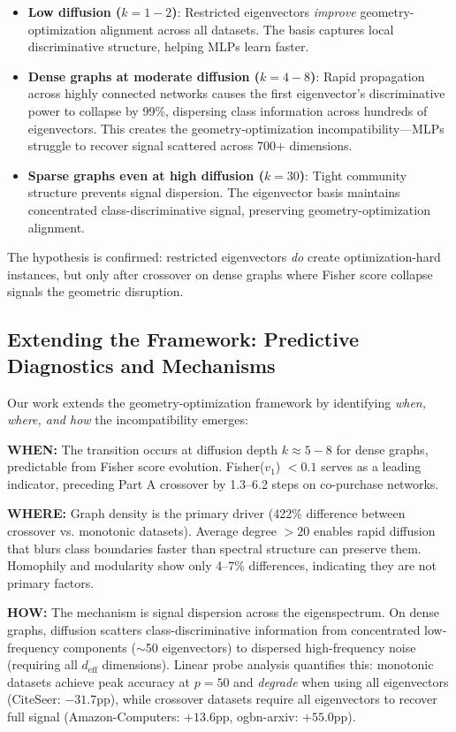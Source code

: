 \documentclass[11pt]{article}
\begin{document}
\begin{itemize}
\item \textbf{Low diffusion ($k{=}1{-}2$)}: Restricted eigenvectors \emph{improve} geometry-optimization alignment across all datasets. The basis captures local discriminative structure, helping MLPs learn faster.

\item \textbf{Dense graphs at moderate diffusion ($k{=}4{-}8$)}: Rapid propagation across highly connected networks causes the first eigenvector's discriminative power to collapse by 99\%, dispersing class information across hundreds of eigenvectors. This creates the geometry-optimization incompatibility—MLPs struggle to recover signal scattered across 700+ dimensions.

\item \textbf{Sparse graphs even at high diffusion ($k{=}30$)}: Tight community structure prevents signal dispersion. The eigenvector basis maintains concentrated class-discriminative signal, preserving geometry-optimization alignment.
\end{itemize}

The hypothesis is confirmed: restricted eigenvectors \emph{do} create optimization-hard instances, but only after crossover on dense graphs where Fisher score collapse signals the geometric disruption.

\subsection{Extending the Framework: Predictive Diagnostics and Mechanisms}

Our work extends the geometry-optimization framework by identifying \emph{when, where, and how} the incompatibility emerges:

\textbf{WHEN:} The transition occurs at diffusion depth $k{\approx}5{-}8$ for dense graphs, predictable from Fisher score evolution. Fisher($v_1$) $< 0.1$ serves as a leading indicator, preceding Part A crossover by 1.3--6.2 steps on co-purchase networks.

\textbf{WHERE:} Graph density is the primary driver (422\% difference between crossover vs. monotonic datasets). Average degree $> 20$ enables rapid diffusion that blurs class boundaries faster than spectral structure can preserve them. Homophily and modularity show only 4--7\% differences, indicating they are not primary factors.

\textbf{HOW:} The mechanism is signal dispersion across the eigenspectrum. On dense graphs, diffusion scatters class-discriminative information from concentrated low-frequency components ($\sim$50 eigenvectors) to dispersed high-frequency noise (requiring all $d_{\text{eff}}$ dimensions). Linear probe analysis quantifies this: monotonic datasets achieve peak accuracy at $p{=}50$ and \emph{degrade} when using all eigenvectors (CiteSeer: $-31.7$pp), while crossover datasets require all eigenvectors to recover full signal (Amazon-Computers: $+13.6$pp, ogbn-arxiv: $+55.0$pp).
\end{document}
